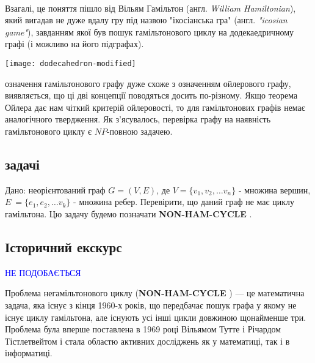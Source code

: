 \documentclass[14pt]{article}
\begin{document}
\begin{spacing}{1.175}
        \\
        \quad Взагалі, це поняття пішло від Вільям Гамільтон (англ. \textit{William Hamiltonian}), який вигадав не дуже вдалу гру під назвою "ікосіанська гра" (англ. \textit{"icosian game"}), завданням якої був пошук гамільтонового циклу на додекаедричному графі (і можливо на його підграфах). \\
        \begin{center}
        \texttt{[image: dodecahedron-modified]} \\
        \end{center}
        
         означення гамільтонового графу дуже схоже з означенням ойлерового графу, виявляється, що ці дві концепції поводяться досить по-різному. Якщо теорема Ойлера дає нам чіткий критерій ойлеровості, то для гамільтонових графів немає аналогічного твердження. Як з'ясувалось, перевірка графу на наявність гамільтонового циклу є \(NP\)-повною задачею.

        \newcommand{\nonhamcycle}{\textbf{NON-HAM-CYCLE }}
        \newcommand{\hamcycle}{\textbf{HAM-CYCLE }}
        \newcommand{\dhampath}{\textbf{D-HAM-PATH }}
        \newcommand{\tsat}{\textbf{3SAT }}

        
        \subsection{ задачі}
        \quad Дано: неорієнтований граф \(G = (V,E)\), де \(V = \{v_1, v_2, \dots v_n\}\) - множина вершин, \(E\ = \{e_1, e_2, \dots v_k\}\) - множина ребер. Перевірити, що даний граф не має циклу гамільтона. Цю задачу будемо позначати \nonhamcycle .    
        \subsection{\normalfont Історичний екскурс}
        \textcolor{blue}{НЕ ПОДОБАЄТЬСЯ}
        
        Проблема негамільтонового циклу (\nonhamcycle) — це математична задача, яка існує з кінця 1960-х років, що передбачає пошук графа у якому не існує циклу гамільтона, але існують усі інші цикли довжиною щонайменше три. Проблема була вперше поставлена в 1969 році Вільямом Тутте і Річардом Тістлетвейтом і стала областю активних досліджень як у математиці, так і в інформатиці.


\end{spacing}
\end{document}
